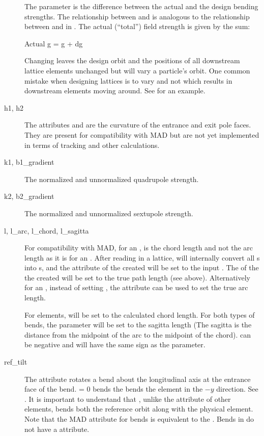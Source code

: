 \begin{description}
The parameter  is the difference between the actual and the design bending strengths. The
relationship between  and  is analogous to the relationship between  and
 in . The actual (``total'') field strength is given by the sum:
\begin{example}
  Actual g = g + dg
\end{example}
Changing  leaves the design orbit and the positions of all downstream lattice elements
unchanged but will vary a particle's orbit. One common mistake when designing lattices is to vary
 and not  which results in downstream elements moving around. See 
for an example.
  \item[h1, h2] \Newline
The attributes  and  are the curvature of the entrance and exit pole faces. They are
present for compatibility with MAD but are not yet implemented in terms of tracking and other
calculations.
  \item[k1, b1_gradient] \Newline
The normalized and unnormalized quadrupole strength.
  \item[k2, b2_gradient] \Newline
The normalized and unnormalized sextupole strength. 
  \item[l, l_arc, l_chord, l_sagitta]  \Newline
For compatibility with MAD, for an ,  is the chord length and not the arc length as
it is for an .  After reading in a lattice, \bmad will internally convert all s
into s, and the  attribute of the created  will be set to the input
. The  of the the created  will be set to the true path length (see
above). Alternatively for an , instead of setting , the  attribute can be
used to set the true arc length. 

For  elements,  will be set to the calculated chord length. For both types of
bends, the  parameter will be set to the sagitta length (The sagitta is the distance
from the midpoint of the arc to the midpoint of the chord).  can be negative and will have
the same sign as the  parameter.
  \item[ref_tilt] \Newline
The  attribute rotates a bend about the longitudinal axis at the entrance face of the
bend.  = 0 bends the bends the element in the $-y$ direction. See . It
is important to understand that , unlike the  attribute of other elements,
bends both the reference orbit along with the physical element. Note that the MAD 
attribute for bends is equivalent to the \bmad {}. Bends in \bmad do not have a 
attribute.
  \end{description}

